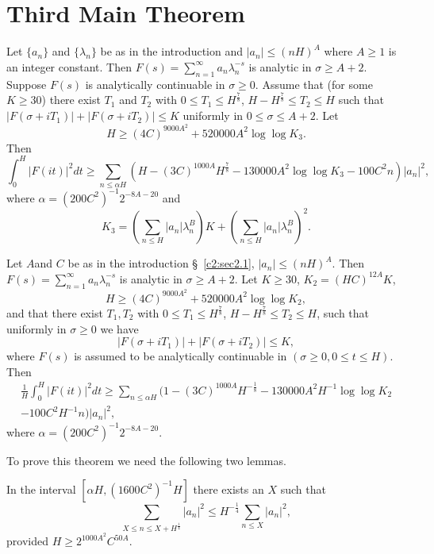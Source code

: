 \section{Third Main Theorem}\label{c2:sec2.5}
Let $\{a_n\}$ and $\{\lambda_n\}$ be as in the introduction and $|a_n| \leq (nH)^A$ where $A \geq 1$ is an integer constant. Then $F(s) = \sum\limits^\infty_{n=1} a_n \lambda^{-s}_n$ is analytic in $\sigma \geq A +2$. Suppose $F(s)$ is analytically continuable in $\sigma \geq 0$. Assume that (for some $K \geq 30$) there exist $T_1$ and $T_2$ with $0\leq T_1 \leq H^{\frac{7}{8}}$, $H- H^{\frac{7}{8}} \leq T_2 \leq H$ such that $|F(\sigma + iT_1)| + |F(\sigma + iT_2)| \leq K$ uniformly in $0 \leq \sigma \leq A + 2$. Let 
$$
H \geq (4C)^{9000 A^2} + 520000 A^2 \log \log K_3. 
$$
Then
{\fontsize{10}{12}\selectfont
$$
\int^H_0 |F(it)|^2 dt \geq  \sum\limits_{n\leq \alpha H} (H -
(3C)^{1000A} H^{\frac{7}{8}} -  130000 A^2 \log \log K_3 - 100 C^2 n)
|a_n|^2,  
$$}
where $\alpha = (200 C^2)^{-1} 2^{-8A - 20}$ and
$$
K_3 = \left( \sum\limits_{n\leq H} |a_n| \lambda^B_n\right) K + \left( \sum\limits_{n\leq H} |a_n| \lambda^B_n\right)^2. 
$$

\begin{coro*}
Let $A$\pageoriginale and $C$ be as in the introduction \S\ \ref{c2:sec2.1}, $|a_n| \leq (nH)^A$. Then $F(s) = \sum\limits^\infty_{n=1} a_n \lambda^{-s}_n$ is analytic in $\sigma \geq A +2$. Let $K \geq 30$, $K_2 = (HC)^{12A} K$, 
$$
H \geq (4C)^{9000 A^2} + 520000 A^2 \log \log K_2, 
$$
and that there exist $T_1, T_2$ with $0\leq T_1 \leq H^{\frac{7}{8}}$, $H - H^{\frac{7}{8}}\leq T_2 \leq H$, such that uniformly in $\sigma \geq 0$ we have
$$
|F(\sigma + iT_1)| + |F(\sigma + iT_2)| \leq K,
$$ 
where $F(s)$ is assumed to be analytically continuable in $(\sigma \geq 0, 0 \leq t \leq H)$. Then
\begin{gather*}
\frac{1}{H} \int^H_0 |F(it)|^2 dt \geq \sum\limits_{n\leq\alpha H} (1-(3C)^{1000A} H^{-\frac{1}{8}} - 130000 A^2 H^{-1} \log \log K_2\\
- 100 C^2 H^{-1} n) |a_n|^2,
\end{gather*}
where $\alpha = (200 C^2)^{-1} 2^{-8A - 20}$.
\end{coro*}

To prove this theorem we need the following two lemmas.

\begin{sublemma}\label{c2:lem2.5.1}
In the interval $[\alpha H, (1600 C^2)^{-1} H]$ there exists an $X$ such that
$$
\sum\limits_{X \leq n \leq X + H^{\frac{1}{4}}} |a_n|^2 \leq H^{-\frac{1}{4}} \sum\limits_{n\leq X} |a_n|^2,
$$
provided $H \geq 2^{1000 A^2} C^{50A}$.
\end{sublemma}

